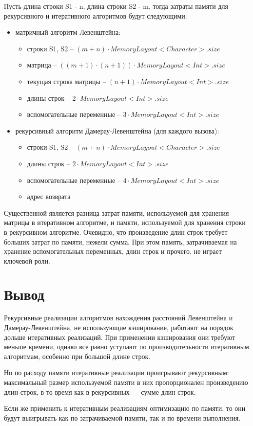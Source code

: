 Пусть длина строки S1 - n, длина строки S2 - m, тогда затраты памяти для рекурсивного и итеративного алгоритмов будут следующими:
\begin{itemize}
\item матричный алгоритм Левенштейна:\begin{itemize}
	\item строки S1, S2 -- $(m + n) \cdot MemoryLayout<Character>.size$
	\item матрица -- $((m + 1) \cdot (n + 1)) \cdot MemoryLayout<Int>.size$
	\item текущая строка матрицы -- $(n + 1) \cdot MemoryLayout<Int>.size$
	\item длины строк -- $2 \cdot MemoryLayout<Int>.size$
	\item вспомогательные переменные -- $3 \cdot MemoryLayout<Int>.size$
	\end{itemize}

\item рекурсивный алгоритм Дамерау-Левенштейна (для каждого вызова):\begin{itemize}
	\item строки S1, S2 -- $(m + n) \cdot MemoryLayout<Character>.size$
	\item длины строк -- $2 \cdot MemoryLayout<Int>.size$
	\item вспомогательные переменные -- $4 \cdot MemoryLayout<Int>.size$
	\item адрес возврата
	\end{itemize}
\end{itemize}

Существенной является разница затрат памяти, используемой для хранения матрицы в итеративном алгоритме, и памяти, используемой для хранения строки в рекурсивном алгоритме. Очевидно, что произведение длин строк требует больших затрат по памяти, нежели сумма. При этом память, затрачиваемая на хранение вспомогательных переменных, длин строк и прочего, не играет ключевой роли. 

\section*{Вывод}


Рекурсивные реализации алгоритмов нахождения расстояний Левенштейна и Дамерау-Левенштейна, не использующие кэширование, работают на порядок дольше итеративных реализаций. При применении кэширования они требуют меньше времени, однако все равно уступают по производительности итеративным алгоритмам, особенно при большой длине строк. 

Но по расходу памяти итеративные реализации проигрывают рекурсивным: максимальный размер используемой памяти в них пропорционален произведению длин строк, в то время как в рекурсивных — сумме длин строк.

Если же применить к итеративным реализациям оптимизацию по памяти, то они будут выигрывать как по затрачиваемой памяти, так и по времени выполнения.
